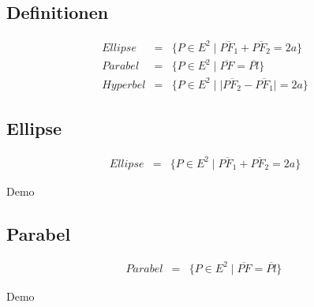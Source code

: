 \subsection{Definitionen}
\begin{frame}
\begin{displaymath}
	\begin{array}{rcl}
		Ellipse  & = & \{P\in E^2\;|\;\overline{{PF}_1} + \overline{{PF}_2} = 2a\}\\
		Parabel  & = & \{P\in E^2\;|\;\overline{PF} = \overline{Pl}\}\\
		Hyperbel & = & \{P\in E^2\;|\;|\overline{{PF}_2} - \overline{{PF}_1}| = 2a\}
	\end{array}
\end{displaymath}
\end{frame}

\subsection{Ellipse}
\begin{frame}
\begin{figure}[h]
	\centering
		\resizebox{.5\linewidth}{!}{
			
		}
\end{figure}
\begin{displaymath}
	\begin{array}{rcl}
		Ellipse  & = & \{P\in E^2\;|\;\overline{{PF}_1} + \overline{{PF}_2} = 2a\}
	\end{array}
\end{displaymath}
\end{frame}
\begin{frame}
\centerline{\huge Demo}
\end{frame}

\subsection{Parabel}
\begin{frame}
\begin{figure}[h]
	\centering
		\resizebox{.5\linewidth}{!}{
			
		}
\end{figure}
\begin{displaymath}
	\begin{array}{rcl}
		Parabel  & = & \{P\in E^2\;|\;\overline{PF} = \overline{Pl}\}\
	\end{array}
\end{displaymath}
\end{frame}
\begin{frame}
\centerline{\huge Demo}
\end{frame}

